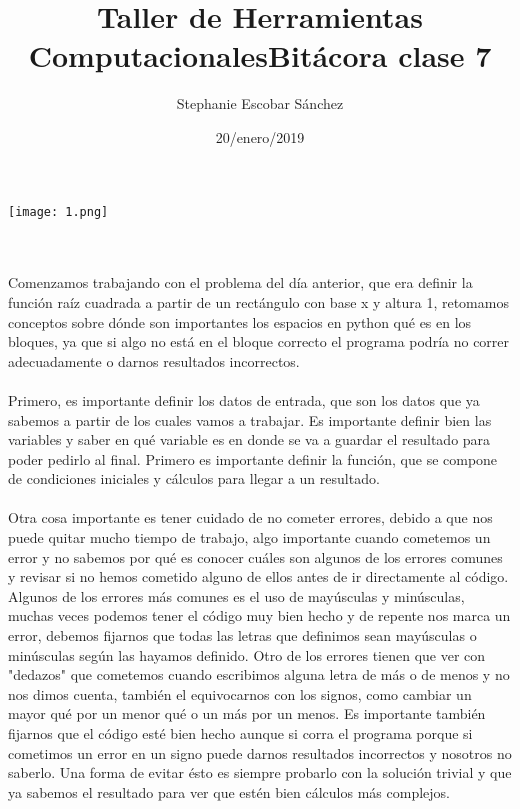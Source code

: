 \documentclass{article}
\title{\Huge Taller de Herramientas Computacionales}
\author{Stephanie Escobar Sánchez}
\date{20/enero/2019}
\begin{document}
	\maketitle
\begin{center}
	\texttt{[image: 1.png]}	
\end{center}
\newpage
\title{\Huge Bitácora clase 7} \\
\\
Comenzamos trabajando con el problema del día anterior, que era definir la función raíz cuadrada a partir de un rectángulo con base x y altura 1, retomamos conceptos sobre dónde son importantes los espacios en python qué es en los bloques, ya que si algo no está en el bloque correcto el programa podría no correr adecuadamente o darnos resultados incorrectos.\\
\\
Primero, es importante definir los datos de entrada, que son los datos que ya sabemos a partir de los cuales vamos a trabajar. Es importante definir bien las variables y saber en qué variable es en donde se va a guardar el resultado para poder pedirlo al final. Primero es importante definir la función, que se compone de condiciones iniciales y cálculos para llegar a un resultado.\\
\\
Otra cosa importante es tener cuidado de no cometer errores, debido a que nos puede quitar mucho tiempo de trabajo, algo importante cuando cometemos un error y no sabemos por qué es conocer cuáles son algunos de los errores comunes y revisar si no hemos cometido alguno de ellos antes de ir directamente al código. Algunos de los errores más comunes es el uso de mayúsculas y minúsculas, muchas veces podemos tener el código muy bien hecho y de repente nos marca un error, debemos fijarnos que todas las letras que definimos sean mayúsculas o minúsculas según las hayamos definido. Otro de los errores tienen que ver con "dedazos" que cometemos cuando escribimos alguna letra de más o de menos y no nos dimos cuenta, también el equivocarnos con los signos, como cambiar un mayor qué por un menor qué o un más por un menos. Es importante también fijarnos que el código esté bien hecho aunque si corra el programa porque si cometimos un error en un signo puede darnos resultados incorrectos y nosotros no saberlo. Una forma de evitar ésto es siempre probarlo con la solución trivial y que ya sabemos el resultado para ver que estén bien cálculos más complejos.\\
\\
\end{document}
